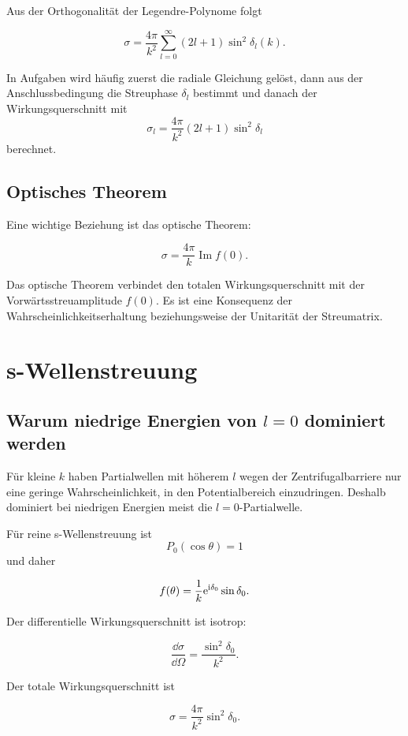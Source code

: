 Aus der Orthogonalität der Legendre-Polynome folgt
\begin{formulabox}
\[
    \sigma
    =\frac{4\pi}{k^2}\sum_{l=0}^{\infty}(2l+1)\sin^2\delta_l(k).
\]
\end{formulabox}

\begin{examtipbox}
In Aufgaben wird häufig zuerst die radiale Gleichung gelöst, dann aus der Anschlussbedingung die Streuphase \(\delta_l\) bestimmt und danach der Wirkungsquerschnitt mit
\[
    \sigma_l=\frac{4\pi}{k^2}(2l+1)\sin^2\delta_l
\]
berechnet.
\end{examtipbox}

\subsection{Optisches Theorem}

Eine wichtige Beziehung ist das optische Theorem:
\begin{formulabox}
\[
    \sigma=\frac{4\pi}{k}\operatorname{Im} f(0).
\]
\end{formulabox}

\begin{notebox}
Das optische Theorem verbindet den totalen Wirkungsquerschnitt mit der Vorwärtsstreuamplitude \(f(0)\). Es ist eine Konsequenz der Wahrscheinlichkeitserhaltung beziehungsweise der Unitarität der Streumatrix.
\end{notebox}

\section{s-Wellenstreuung}

\subsection{Warum niedrige Energien von \texorpdfstring{\(l=0\)}{l=0} dominiert werden}

Für kleine \(k\) haben Partialwellen mit höherem \(l\) wegen der Zentrifugalbarriere nur eine geringe Wahrscheinlichkeit, in den Potentialbereich einzudringen. Deshalb dominiert bei niedrigen Energien meist die \(l=0\)-Partialwelle.

Für reine s-Wellenstreuung ist
\[
    P_0(\cos\theta)=1
\]
und daher
\begin{formulabox}
\[
    f(\theta)=\frac{1}{k}\mathrm{e}^{\mathrm{i}\delta_0}\sin\delta_0.
\]
\end{formulabox}
Der differentielle Wirkungsquerschnitt ist isotrop:
\begin{formulabox}
\[
    \frac{\dd\sigma}{\dd\Omega}=\frac{\sin^2\delta_0}{k^2}.
\]
\end{formulabox}
Der totale Wirkungsquerschnitt ist
\begin{formulabox}
\[
    \sigma=\frac{4\pi}{k^2}\sin^2\delta_0.
\]
\end{formulabox}

